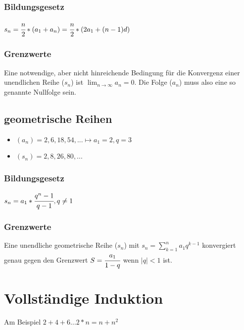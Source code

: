 \documentclass[a4paper,12pt]{scrartcl}
\begin{document}
\subsubsection{Bildungsgesetz}
$s_n = \cfrac{n}{2} * (a_1 + a_n) = \cfrac{n}{2} * (2a_1 + (n - 1)d)$

\subsubsection{Grenzwerte}
Eine notwendige, aber nicht hinreichende Bedingung für die Konvergenz einer unendlichen Reihe ($s_n$) ist  	$\lim_{n \to \infty} a_n = 0$. Die Folge ($a_n$) muss also eine so genannte Nullfolge sein. 

\subsection{geometrische Reihen}
\begin{itemize}
\item $(a_n) = 2, 6, 18, 54, ... \mapsto a_1 = 2, q = 3$ 
\item $(s_n) = 2, 8, 26, 80, ...$
\end{itemize}

\subsubsection{Bildungsgesetz}
$s_n = a_1 * \cfrac{q^n - 1}{q - 1}, q \ne 1$

\subsubsection{Grenzwerte}
Eine unendliche geometrische Reihe ($s_n$) mit $s_n = \sum\limits_{k=1}^n a_1 q^{k-1}$ konvergiert genau gegen den Grenzwert $S=\cfrac{a_1}{1-q}$ wenn $|q| < 1$ ist.

\newpage
\section{Vollständige Induktion}
Am Beispiel $ 2 + 4 + 6 ... 2 * n = n + n^2$
\end{document}

